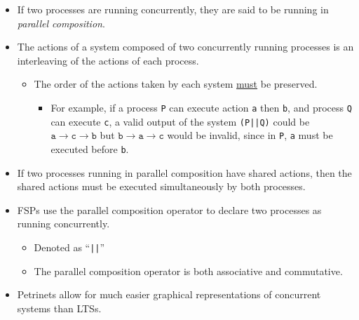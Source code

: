 \documentclass{article}
\begin{document}
\begin{itemize}
	\item If two processes are running concurrently, they are said to be running in \emph{parallel composition}.
	\item The actions of a system composed of two concurrently running processes is an interleaving of the actions of each process.
	\begin{itemize}
		\item The order of the actions taken by each system \underline{must} be preserved.
		\begin{itemize}
			\item For example, if a process \texttt{P} can execute action \texttt{a} then \texttt{b}, and process \texttt{Q} can execute \texttt{c}, a valid output of the system \texttt{(P||Q)} could be $\mathtt{a} \rightarrow \mathtt{c} \rightarrow \mathtt{b}$ but $\mathtt{b} \rightarrow \mathtt{a} \rightarrow \mathtt{c}$ would be invalid, since in \texttt{P}, \texttt{a} must be executed before \texttt{b}.
		\end{itemize}
	\end{itemize}
	\item If two processes running in parallel composition have shared actions, then the shared actions must be executed simultaneously by both processes.
	\item FSPs use the parallel composition operator to declare two processes as running concurrently.
	\begin{itemize}
		\item Denoted as ``\texttt{||}''
		\item The parallel composition operator is both associative and commutative.
	\end{itemize}
	\item Petrinets allow for much easier graphical representations of concurrent systems than LTSs.
\end{itemize}

\ifdefined\iscombined
\newpage
\else
  
\end{document}
